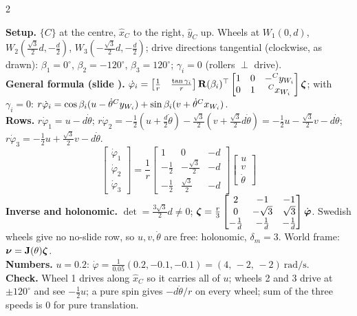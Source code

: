 \begin{multicols}{2}
\begin{examq}
\solution
\textbf{Setup.} $\{C\}$ at the centre, $\hat x_C$ to the right, $\hat y_C$ up. Wheels at $W_1(0,d)$, $W_2(\tfrac{\sqrt3}2d,-\tfrac d2)$, $W_3(-\tfrac{\sqrt3}2d,-\tfrac d2)$; drive directions tangential (clockwise, as drawn): $\beta_1=0^\circ$, $\beta_2=-120^\circ$, $\beta_3=120^\circ$; $\gamma_i=0$ (rollers $\perp$ drive). \\
\textbf{General formula (slide ).} $\dot\varphi_i=\begin{bmatrix}\frac1r&\frac{\tan\gamma_i}r\end{bmatrix}\mathbf R(\beta_i)^\top\begin{bmatrix}1&0&-{}^{C}y_{W_{i}}\\0&1&{}^{C}x_{W_{i}}\end{bmatrix}\boldsymbol\zeta$; with $\gamma_i=0$: $r\dot\varphi_i=\cos\beta_i(u-\dot\theta{}^{C}y_{W_{i}})+\sin\beta_i(v+\dot\theta{}^{C}x_{W_{i}})$. \\
\textbf{Rows.} $r\dot\varphi_1=u-d\dot\theta$; $r\dot\varphi_2=-\frac12(u+\frac d2\dot\theta)-\frac{\sqrt3}2(v+\frac{\sqrt3}2d\dot\theta)=-\frac12u-\frac{\sqrt3}2v-d\dot\theta$; $r\dot\varphi_3=-\frac12u+\frac{\sqrt3}2v-d\dot\theta$. 
\[\boxed{\begin{bmatrix}\dot\varphi_1\\\dot\varphi_2\\\dot\varphi_3\end{bmatrix}=\frac1r\begin{bmatrix}1&0&-d\\-\frac12&-\frac{\sqrt3}2&-d\\-\frac12&\frac{\sqrt3}2&-d\end{bmatrix}\begin{bmatrix}u\\v\\\dot\theta\end{bmatrix}}\]
\textbf{Inverse and holonomic.} $\det=\tfrac{3\sqrt3}2d\neq0$; $\boldsymbol\zeta=\frac r3\begin{bmatrix}2&-1&-1\\0&-\sqrt3&\sqrt3\\-\frac1d&-\frac1d&-\frac1d\end{bmatrix}\dot{\boldsymbol\varphi}$. Swedish wheels give no no-slide row, so $u,v,\dot\theta$ are free: holonomic, $\delta_m=3$. World frame: $\boldsymbol\nu=\mathbf J(\theta)\boldsymbol\zeta$. \\
\textbf{Numbers.} $u=0.2$: $\dot\varphi=\frac1{0.05}(0.2,-0.1,-0.1)=\boxed{(4,\,-2,\,-2)\ \text{rad/s}}$. \\
\textbf{Check.} Wheel 1 drives along $\hat x_C$ so it carries all of $u$; wheels 2 and 3 drive at $\pm120^\circ$ and see $-\frac12u$; a pure spin gives $-d\dot\theta/r$ on every wheel; sum of the three speeds is $0$ for pure translation. \chk
\end{examq}


\end{multicols}
